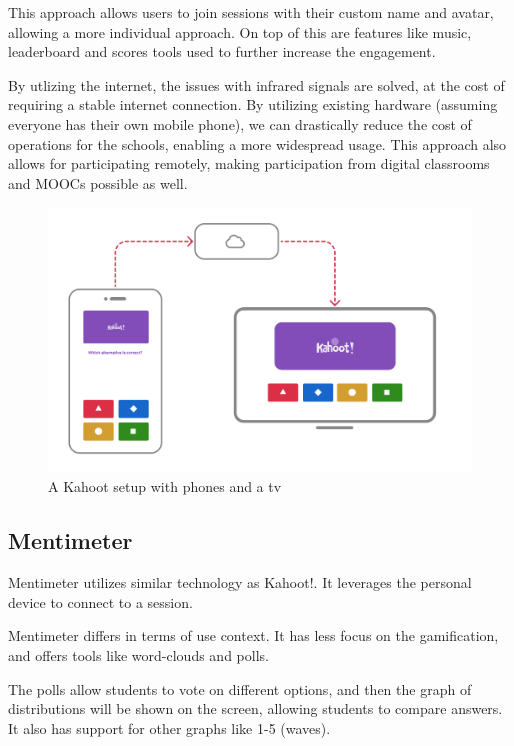 This approach allows users to join sessions with their custom name and avatar, allowing a more individual approach. On top of this are features like music, leaderboard and scores tools used to further increase the engagement.

By utlizing the internet, the issues with infrared signals are solved, at the cost of requiring a stable internet connection. By utilizing existing hardware (assuming everyone has their own mobile phone), we can drastically reduce the cost of operations for the schools, enabling a more widespread usage. This approach also allows for participating remotely, making participation from digital classrooms and MOOCs possible as well. 


\begin{figure}[h!]
    \centering
    \includegraphics[width=1\linewidth]{figures/kahoot-illustration.png}
    \caption{A Kahoot setup with phones and a tv}
    \label{fig:kahoot}
\end{figure}

\subsection{Mentimeter}
Mentimeter utilizes similar technology as Kahoot!. It leverages the personal device to connect to a session. 

Mentimeter differs in terms of use context. It has less focus on the gamification, and offers tools like word-clouds and polls.

The polls allow students to vote on different options, and then the graph of distributions will be shown on the screen, allowing students to compare answers. It also has support for other graphs like 1-5 (waves).

